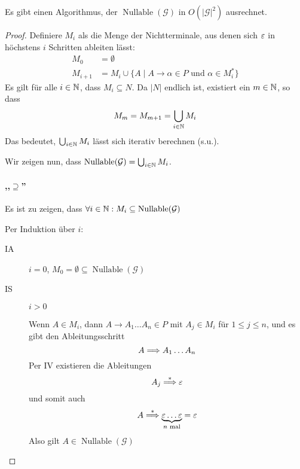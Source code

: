 \begin{Satz}
  Es gibt einen Algorithmus, der $\operatorname{Nullable}(\mathcal{G})$ in $O(|\mathcal{G}|^2)$ ausrechnet.
\end{Satz}
\begin{proof}
  Definiere $M_i$ als die Menge der Nichtterminale, aus denen sich $\varepsilon$ in höchstens $i$ Schritten ableiten lässt:
  \begin{align*}
    M_0 &= \emptyset \\
    M_{i+1} &= M_i \cup \{ A \mid A \to \alpha \in P \text{ und } \alpha \in M_i^* \}
  \end{align*}
  Es gilt für alle $i \in \mathbb{N}$, dass $M_i \subseteq N$.
  Da $|N|$ endlich ist, existiert ein $m \in \mathbb{N}$, so dass
  \begin{displaymath}
    M_m = M_{m+1} = \bigcup_{i \in \mathbb{N}} M_i
  \end{displaymath}
  Das bedeutet, $\bigcup_{i \in \mathbb{N}} M_i$ lässt sich iterativ berechnen (s.u.).

  Wir zeigen nun, dass $\operatorname{Nullable}(\mathcal{G}) = \bigcup_{i \in \mathbb{N}} M_i$.

  \paragraph{,,$\supseteq$''}
  Es ist zu zeigen, dass $\forall i \in \mathbb{N}: M_i \subseteq \operatorname{Nullable}(\mathcal{G})$

  Per Induktion über $i$:
  \begin{description}
  \item[IA] $i = 0$, $M_0 = \emptyset \subseteq \operatorname{Nullable}(\mathcal{G})$
  \item[IS] $i > 0$ 

    Wenn $A \in M_i$, dann $A \to A_1\ldots A_n \in P$ mit $A_j \in M_i$ für $1 \le j \le n$, und es gibt den Ableitungsschritt
    \begin{displaymath}
      A \==> A_1 \ldots A_n
    \end{displaymath}
    Per IV existieren die Ableitungen
    \begin{displaymath}
      A_j \stackrel{*}{\==>} \Eps
    \end{displaymath}
    und somit auch
    \begin{displaymath}
      A \stackrel{*}{\==>} \underbrace{\Eps \ldots \Eps}_{n \text{ mal}} = \Eps
    \end{displaymath}
    Also gilt $A \in \operatorname{Nullable}(\mathcal{G})$
  \end{description}


\end{proof}
